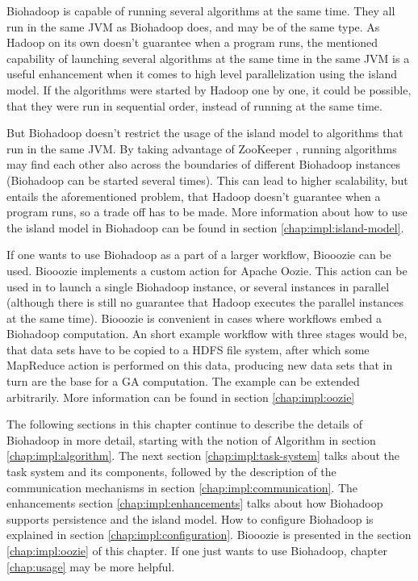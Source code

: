   Biohadoop is capable of running several algorithms at the same time. They all run in the same JVM as Biohadoop does, and may be of the same type. As Hadoop on its own doesn't guarantee when a program runs, the mentioned capability of launching several algorithms at the same time in the same JVM is a useful enhancement when it comes to high level parallelization using the island model. If the algorithms were started by Hadoop one by one, it could be possible, that they were run in sequential order, instead of running at the same time.
  
  But Biohadoop doesn't restrict the usage of the island model to algorithms that run in the same JVM. By taking advantage of ZooKeeper \cite{zookeeper}, running algorithms may find each other also across the boundaries of different Biohadoop instances (Biohadoop can be started several times). This can lead to higher scalability, but entails the aforementioned problem, that Hadoop doesn't guarantee when a program runs, so a trade off has to be made. More information about how to use the island model in Biohadoop can be found in section \ref{chap:impl:island-model}.
  
  If one wants to use Biohadoop as a part of a larger workflow, Biooozie can be used. Biooozie implements a custom action for Apache Oozie. This action can be used in to launch a single Biohadoop instance, or several instances in parallel (although there is still no guarantee that Hadoop executes the parallel instances at the same time). Biooozie is convenient in cases where workflows embed a Biohadoop computation. An short example workflow with three stages would be, that data sets have to be copied to a HDFS file system, after which some MapReduce action is performed on this data, producing new data sets that in turn are the base for a GA computation. The example can be extended arbitrarily. More information can be found in section \ref{chap:impl:oozie}
  
  The following sections in this chapter continue to describe the details of Biohadoop in more detail, starting with the notion of Algorithm in section \ref{chap:impl:algorithm}. The next section \ref{chap:impl:task-system} talks about the task system and its components, followed by the description of the communication mechanisms in section \ref{chap:impl:communication}. The enhancements section \ref{chap:impl:enhancements} talks about how Biohadoop supports persistence and the island model. How to configure Biohadoop is explained in section \ref{chap:impl:configuration}. Biooozie is presented in the section \ref{chap:impl:oozie} of this chapter. If one just wants to use Biohadoop, chapter \ref{chap:usage} may be more helpful.
  
